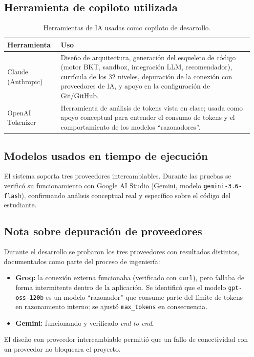 \documentclass[11pt,letterpaper]{article}
\begin{document}
\subsection{Herramienta de copiloto utilizada}
\begin{table}[H]
\centering
\small
\begin{tabular}{@{}p{4cm}p{9cm}@{}}
\toprule
\textbf{Herramienta} & \textbf{Uso} \\
\midrule
Claude (Anthropic) & Diseño de arquitectura, generación del esqueleto
de código (motor BKT, sandbox, integración LLM, recomendador),
currícula de los 32 niveles, depuración de la conexión con proveedores
de IA, y apoyo en la configuración de Git/GitHub. \\
OpenAI Tokenizer & Herramienta de análisis de tokens vista en clase;
usada como apoyo conceptual para entender el consumo de tokens y el
comportamiento de los modelos ``razonadores''. \\
\bottomrule
\end{tabular}
\caption{Herramientas de IA usadas como copiloto de desarrollo.}
\end{table}

\subsection{Modelos usados en tiempo de ejecución}
El sistema soporta tres proveedores intercambiables. Durante las
pruebas se verificó su funcionamiento con Google AI Studio (Gemini,
modelo \texttt{gemini-3.6-flash}), confirmando análisis conceptual
real y específico sobre el código del estudiante.

\subsection{Nota sobre depuración de proveedores}
Durante el desarrollo se probaron los tres proveedores con resultados
distintos, documentados como parte del proceso de ingeniería:
\begin{itemize}[leftmargin=*]
  \item \textbf{Groq:} la conexión externa funcionaba (verificado con
  \texttt{curl}), pero fallaba de forma intermitente dentro de la
  aplicación. Se identificó que el modelo \texttt{gpt-oss-120b} es un
  modelo ``razonador'' que consume parte del límite de tokens en
  razonamiento interno; se ajustó \texttt{max\_tokens} en
  consecuencia.
  \item \textbf{Gemini:} funcionando y verificado \textit{end-to-end}.
\end{itemize}
El diseño con proveedor intercambiable permitió que un fallo de
conectividad con un proveedor no bloqueara el proyecto.
\end{document}
